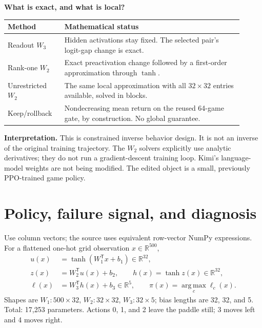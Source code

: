 \documentclass[11pt]{article}
\newcommand{\R}{\mathbb{R}}
\newcommand{\argmax}{\operatorname*{arg\,max}}
\begin{document}
\textbf{What is exact, and what is local?}
\begin{center}
\begin{tabular}{p{0.22\linewidth}p{0.69\linewidth}}
\toprule
Method & Mathematical status \\
\midrule
Readout $W_3$ & Hidden activations stay fixed. The selected pair's logit-gap change is exact. \\
Rank-one $W_2$ & Exact preactivation change followed by a first-order approximation through $\tanh$. \\
Unrestricted $W_2$ & The same local approximation with all $32\times32$ entries available, solved in blocks. \\
Keep/rollback & Nondecreasing mean return on the reused 64-game gate, by construction. No global guarantee. \\
\bottomrule
\end{tabular}
\end{center}

\textbf{Interpretation.} This is constrained inverse behavior design. It is not
an inverse of the original training trajectory. The $W_2$ solvers explicitly
use analytic derivatives; they do not run a gradient-descent training loop.
Kimi's language-model weights are not being modified. The edited object is a
small, previously PPO-trained game policy.

\clearpage
\normalsize
\section{Policy, failure signal, and diagnosis}
Use column vectors; the source uses equivalent row-vector NumPy expressions.
For a flattened one-hot grid observation $x\in\R^{500}$,
\begin{align}
 u(x)&=\tanh(W_1^{\mathsf T}x+b_1)\in\R^{32},\nonumber\\
 z(x)&=W_2^{\mathsf T}u(x)+b_2,\qquad h(x)=\tanh z(x)\in\R^{32},\nonumber\\
 \ell(x)&=W_3^{\mathsf T}h(x)+b_3\in\R^5,\qquad
 \pi(x)=\argmax_{c}\ell_c(x).
 \label{eq:network}
\end{align}
Shapes are $W_1:500\times32$, $W_2:32\times32$, $W_3:32\times5$;
bias lengths are 32, 32, and 5. Total: 17,253 parameters.
Actions 0, 1, and 2 leave the paddle still; 3 moves left and 4 moves right.
\end{document}
